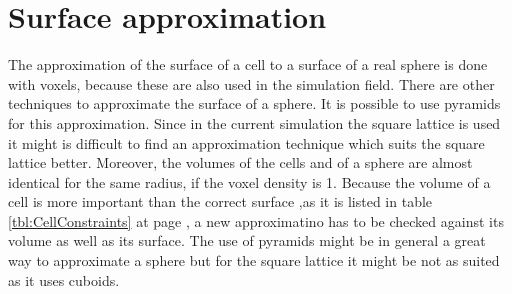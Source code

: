 \section{Surface approximation}
The approximation of the surface of a cell to a surface of a real sphere is done with voxels, because these are also used in the simulation field. There are other techniques to approximate the surface of a sphere. It is possible to use pyramids for this approximation. Since in the current simulation the square lattice is used it might is difficult to find an approximation technique which suits the square lattice better. Moreover, the volumes of the cells and of a sphere are almost identical for the same radius, if the voxel density is 1. Because the volume of a cell is more important than the correct surface ,as it is listed in table \ref{tbl:CellConstraints} at page \pageref{tbl:CellConstraints}, a new approximatino has to be checked against its volume as well as its surface. The use of pyramids might be in general a great way to approximate a sphere but for the square lattice it might be not as suited as it uses cuboids.

